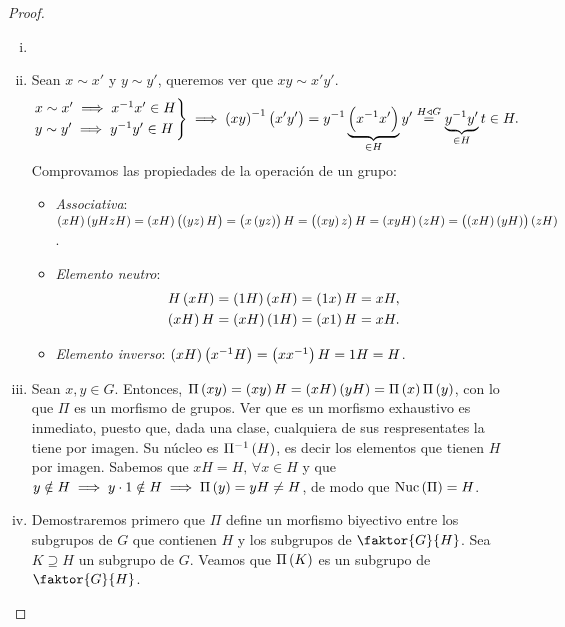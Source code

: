 \begin{proof}%
    \begin{enumerate}[i)]
        \item[]
        \item Sean $x\sim x'$ y $y\sim y'$, queremos ver que $xy\sim x'y'$.
            \[
                \begin{rcases}
                    x\sim x' \implies x^{-1}x' \in H\\
                    y\sim y' \implies y^{-1}y' \in H
                \end{rcases}
                \implies \left( xy\right) ^{-1}\left( x'y'\right) = y^{-1} \underbrace{\left( x^{-1}x'\right)}_{\in H} y'\stackrel{H\triangleleft G}{=} \underbrace{y^{-1}y'}_{\in H}t \in H.
            \]
            Comprovamos las propiedades de la operación de un grupo:
            \begin{itemize}
                \item \emph{Associativa}: $\left( xH\right)\left( yHzH\right) = \left( xH\right) \left(\left( yz\right) H\right) = \left( x\left( yz\right) \right) H = \left( \left( xy\right) z\right) H = \left( xyH\right) \left( zH\right) = \left( \left( xH\right) \left( yH\right) \right) \left( zH\right)$.
                \item \emph{Elemento neutro}:
                    \begin{align*}
                        H\left( xH\right) &= \left( 1H\right) \left( xH\right) = \left( 1x\right) H = xH, \\
                        \left( xH\right) H &= \left( xH\right) \left( 1H\right) = \left( x1\right) H = xH.
                    \end{align*}
                \item \emph{Elemento inverso}: $\left( xH\right)\left( x^{-1}H\right) = \left( xx^{-1}\right) H = 1H = H$.
            \end{itemize}
        \item Sean $x, y\in G$. Entonces, $\Pi\left( xy\right) = \left( xy\right) H=\left( xH\right)\left( yH\right) = \Pi\left( x\right)\Pi\left( y\right)$, con lo que $\Pi$ es un morfismo de grupos. Ver que es un morfismo exhaustivo es inmediato, puesto que, dada una clase, cualquiera de sus respresentates la tiene por imagen. Su núcleo es $\Pi^{-1}\left( H\right)$, es decir los elementos que tienen $H$ por imagen. Sabemos que $xH=H,\,\forall x\in H$ y que $y\notin H\implies y\cdot 1\notin H\implies \Pi\left( y\right)=yH\neq H$, de modo que $\operatorname{Nuc}\left(\Pi\right)=H$.
        \item Demostraremos primero que $\Pi$ define un morfismo biyectivo entre los subgrupos de $G$ que contienen $H$ y los subgrupos de $\faktor{G}{H}$. Sea $K\supseteq H$ un subgrupo de $G$. Veamos que $\Pi\left( K\right)$ es un subgrupo de $\faktor{G}{H}$.

\end{enumerate}
\end{proof}
